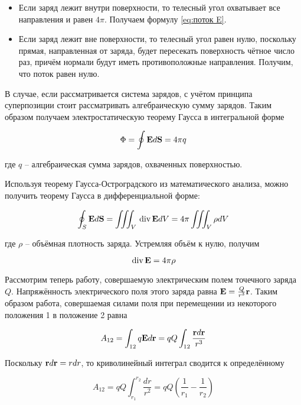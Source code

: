 \begin{itemize}
    \item Если заряд лежит внутри поверхности, то телесный угол охватывает все направления и равен $4 \pi$. Получаем формулу \eqref{eq:поток E}.
    \item Если заряд лежит вне поверхности, то телесный угол равен нулю, поскольку прямая, направленная от заряда, будет пересекать поверхность чётное число раз, причём нормали будут иметь противоположные направления. Получим, что поток равен нулю.
\end{itemize}

В случае, если рассматривается система зарядов, с учётом принципа суперпозиции стоит рассматривать алгебраическую сумму зарядов. Таким образом получаем электростатическую теорему Гаусса в интегральной форме

\begin{equation}
    \Phi = \oint \mathbf E d \mathbf S = 4 \pi q
\end{equation}

\noindent
где $q$ -- алгебраическая сумма зарядов, охваченных поверхностью.

Используя теорему Гаусса-Остроградского из математического анализа, можно получить теорему Гаусса в дифференциальной форме:

\begin{equation*}
    \oint_S \mathbf E d \mathbf S = \iiint_V \, \text{div} \, \mathbf E dV = 4 \pi \iiint_V \rho dV
\end{equation*}

\noindent
где $\rho$ -- объёмная плотность заряда. Устремляя объём к нулю, получим

\begin{equation}
    \, \text{div} \, \mathbf E = 4 \pi \rho
\end{equation}

Рассмотрим теперь работу, совершаемую электрическим полем точечного заряда $Q$. Напряжённость электрического поля этого заряда равна $\mathbf E = \frac{Q}{r^3} \mathbf r$. Таким образом работа, совершаемая силами поля при перемещении из некоторого положения 1 в положение 2 равна

\begin{equation*}
    A_{12} = \int_{12} q \mathbf E d \mathbf r = q Q \int_{12} \frac{\mathbf r d \mathbf r}{r^3}
\end{equation*}

\noindent
Поскольку $\mathbf r d \mathbf r = r dr$, то криволинейный интеграл сводится к определённому

\begin{equation}
    A_{12} = q Q\int_{r_1}^{r_2} \frac{dr}{r^2} = q Q \left( \frac{1}{r_1} - \frac{1}{r_2} \right)
\end{equation}


